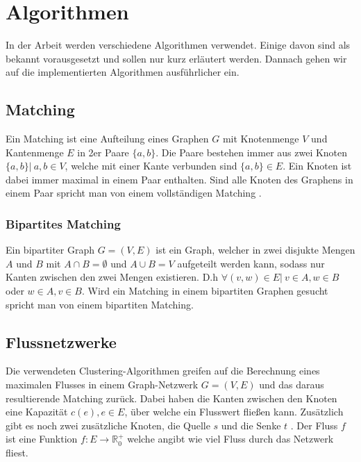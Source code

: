 
\chapter{Algorithmen}\label{chap:Algorithms}

    In der Arbeit werden verschiedene Algorithmen verwendet. Einige davon sind als bekannt vorausgesetzt und sollen nur kurz erläutert werden. Dannach gehen wir auf die implementierten Algorithmen ausführlicher ein.

\section{Matching}
    Ein Matching ist eine Aufteilung eines Graphen $G$ mit Knotenmenge $V$ und Kantenmenge $E$ in 2er Paare $\{a, b\}$. Die Paare bestehen immer aus zwei Knoten $\{a, b\} |\ a,b \in V$, welche mit einer Kante verbunden sind $\{a, b\} \in E$. Ein Knoten ist dabei immer maximal in einem Paar enthalten. Sind alle Knoten des Graphens in einem Paar spricht man von einem vollständigen Matching \cite{Graphen_Skript}.
    \subsection{Bipartites Matching}
        Ein bipartiter Graph $G = (V, E)$ ist ein Graph, welcher in zwei disjukte Mengen $A$ und $B$ mit $A \cap B = \emptyset$ und $A \cup B = V$ aufgeteilt werden kann, sodass nur Kanten zwischen den zwei Mengen existieren. D.h $\forall (v, w) \in E |\ v \in A, w \in B$ oder $w \in A, v \in B$. Wird ein Matching in einem bipartiten Graphen gesucht spricht man von einem bipartiten Matching.



\section{Flussnetzwerke}
    Die verwendeten Clustering-Algorithmen greifen auf die Berechnung eines maximalen Flusses in einem Graph-Netzwerk $G = (V, E)$ und das daraus resultierende Matching zurück. Dabei haben die Kanten zwischen den Knoten eine Kapazität $c(e), e \in E$, über welche ein Flusswert fließen kann. Zusätzlich gibt es noch zwei zusätzliche Knoten, die Quelle $s$ und die Senke $t$ \cite{Graphen_Skript}. Der Fluss $f$ ist eine Funktion $f : E \rightarrow \mathbb{R}^{+}_{0}$ welche angibt wie viel Fluss durch das Netzwerk fliest.

